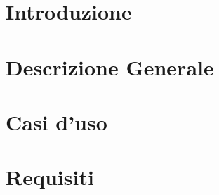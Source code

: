 \documentclass[]{article}
\begin{document}
	
	\newpage


	\section{Introduzione}
	
	\newpage

	\section{Descrizione Generale}
	
	\newpage

	\section{Casi d'uso}
	
	\newpage
	
	\section{Requisiti}
	
	\newpage
	

	
\end{document}

